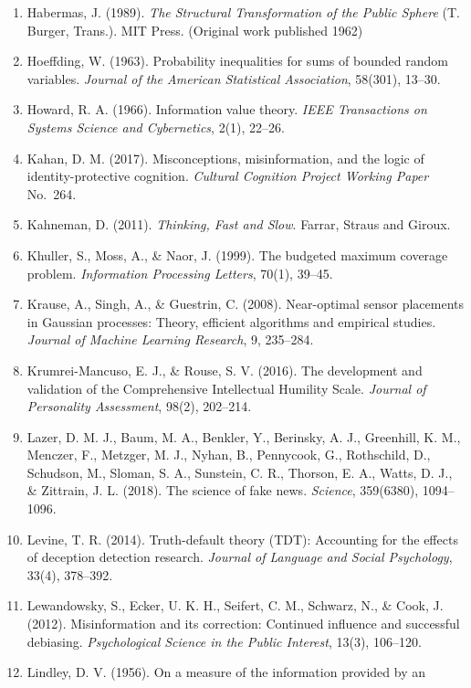 \documentclass[
  11pt]{article}
\begin{document}
\begin{enumerate}
\item
  Habermas, J. (1989). \emph{The Structural Transformation of the Public
  Sphere} (T. Burger, Trans.). MIT Press. (Original work published 1962)
\item
  Hoeffding, W. (1963). Probability inequalities for sums of bounded
  random variables. \emph{Journal of the American Statistical
  Association}, 58(301), 13--30.
\item
  Howard, R. A. (1966). Information value theory. \emph{IEEE
  Transactions on Systems Science and Cybernetics}, 2(1), 22--26.
\item
  Kahan, D. M. (2017). Misconceptions, misinformation, and the logic of
  identity-protective cognition. \emph{Cultural Cognition Project
  Working Paper} No.~264.
\item
  Kahneman, D. (2011). \emph{Thinking, Fast and Slow}. Farrar, Straus
  and Giroux.
\item
  Khuller, S., Moss, A., \& Naor, J. (1999). The budgeted maximum
  coverage problem. \emph{Information Processing Letters}, 70(1),
  39--45.
\item
  Krause, A., Singh, A., \& Guestrin, C. (2008). Near-optimal sensor
  placements in Gaussian processes: Theory, efficient algorithms and
  empirical studies. \emph{Journal of Machine Learning Research}, 9,
  235--284.
\item
  Krumrei-Mancuso, E. J., \& Rouse, S. V. (2016). The development and
  validation of the Comprehensive Intellectual Humility Scale.
  \emph{Journal of Personality Assessment}, 98(2), 202--214.
\item
  Lazer, D. M. J., Baum, M. A., Benkler, Y., Berinsky, A. J., Greenhill,
  K. M., Menczer, F., Metzger, M. J., Nyhan, B., Pennycook, G.,
  Rothschild, D., Schudson, M., Sloman, S. A., Sunstein, C. R., Thorson,
  E. A., Watts, D. J., \& Zittrain, J. L. (2018). The science of fake
  news. \emph{Science}, 359(6380), 1094--1096.
\item
  Levine, T. R. (2014). Truth-default theory (TDT): Accounting for the
  effects of deception detection research. \emph{Journal of Language and
  Social Psychology}, 33(4), 378--392.
\item
  Lewandowsky, S., Ecker, U. K. H., Seifert, C. M., Schwarz, N., \&
  Cook, J. (2012). Misinformation and its correction: Continued
  influence and successful debiasing. \emph{Psychological Science in the
  Public Interest}, 13(3), 106--120.
\item
  Lindley, D. V. (1956). On a measure of the information provided by an

\end{enumerate}
\end{document}
